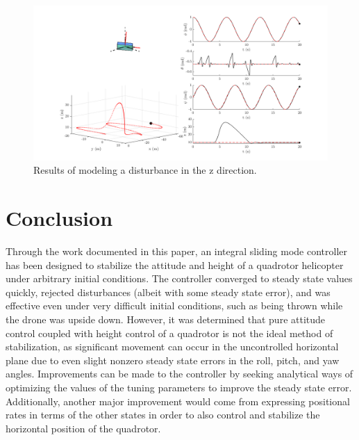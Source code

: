 \documentclass[12pt]{article}
\begin{document}
\begin{center}
\begin{figure}[H]
\captionsetup{width=1\textwidth}
\centering
\includegraphics[width=1\textwidth]{zdisturbance.png}
\caption{\label{fig:zdisturbance}Results of modeling a disturbance in the z direction.}
\end{figure}
\end{center}


\section{Conclusion}
Through the work documented in this paper, an integral sliding mode controller has been designed to stabilize the attitude and height of a quadrotor helicopter under arbitrary initial conditions. The controller converged to steady state values quickly, rejected disturbances (albeit with some steady state error), and was effective even under very difficult initial conditions, such as being thrown while the drone was upside down. However, it was determined that pure attitude control coupled with height control of a quadrotor is not the ideal method of stabilization, as significant movement can occur in the uncontrolled horizontal plane due to even slight nonzero steady state errors in the roll, pitch, and yaw angles. Improvements can be made to the controller by seeking analytical ways of optimizing the values of the tuning parameters to improve the steady state error. Additionally, another major improvement would come from expressing positional rates in terms of the other states in order to also control and stabilize the horizontal position of the quadrotor.
\end{document}
